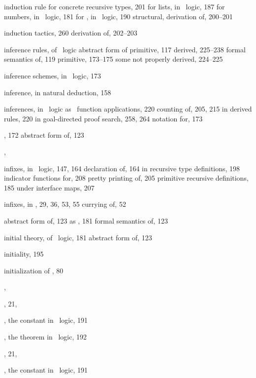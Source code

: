 \begin{theindex}
  \item induction rule
    \subitem for concrete recursive types, 201
    \subitem for lists, in \HOL\ logic, 187
    \subitem for numbers, in \HOL\ logic, 181
    \subitem for , in \HOL\ logic, 190
    \subitem structural, derivation of, 200--201
  \item induction tactics, 260
    \subitem derivation of, 202--203
  \item inference rules, of \HOL\ logic
    \subitem abstract form of primitive, 117
    \subitem derived, 225--238
    \subitem formal semantics of, 119
    \subitem primitive, 173--175
    \subitem some not properly derived, 224--225
  \item inference schemes, in \HOL\ logic, 173
  \item inference, in natural deduction, 158
  \item inferences, in \HOL\ logic
    \subitem as \ML\ function applications, 220
    \subitem counting of, 205, 215
    \subitem in derived rules, 220
    \subitem in goal-directed proof search, 258, 264
    \subitem notation for, 173
  \item {}, 172
    \subitem abstract form of, 123
  \item {}, 
  \item infixes, in \HOL\ logic, 147, 164
    \subitem declaration of, 164
    \subitem in recursive type definitions, 198
    \subitem indicator functions for, 208
    \subitem pretty printing of, 205
    \subitem primitive recursive definitions, 185
    \subitem under interface maps, 207
  \item infixes, in \ML, 29, 36, 53, 55
    \subitem currying of, 52
  \item {}
    \subitem abstract form of, 123
    \subitem as , 181
    \subitem formal semantics of, 123
  \item initial theory, of \HOL\ logic, 181
    \subitem abstract form of, 123
  \item initiality, 195
  \item initialization of \HOL, 80
  \item {}, 
  \item {}, 21, 
  \item {}, the constant in \HOL\ logic, 191
  \item {}, the theorem in \HOL\ logic, 192
  \item {}, 21, 
  \item {}, the constant in \HOL\ logic, 191

\end{theindex}
